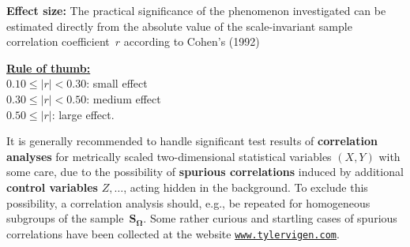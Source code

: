 \medskip
\noindent
\textbf{Effect size:} The practical significance of the phenomenon investigated can be estimated directly from the absolute value of
the scale-invariant sample correlation coefficient~$r$ according to
Cohen's (1992)~

\medskip
\noindent
\underline{\textbf{Rule of thumb:}}\\
$0.10 \leq |r| < 0.30$: small effect\\
$0.30 \leq |r| < 0.50$: medium effect\\
$0.50 \leq |r|$: large effect.

\medskip
\noindent
It is generally recommended to handle significant test results of 
\textbf{correlation analyses} for metrically scaled two-dimensional
statistical variables $(X,Y)$ with some care, due to the 
possibility of \textbf{spurious correlations} induced by additional 
\textbf{control variables} $Z, \ldots$, acting hidden in the 
background. To exclude this possibility, a correlation analysis 
should, e.g., be repeated for homogeneous subgroups of the 
sample~$\boldsymbol{S_{\Omega}}$. Some rather curious and 
startling cases of spurious correlations have been collected at 
the website
\href{http://www.tylervigen.com/}{\texttt{www.tylervigen.com}}.

